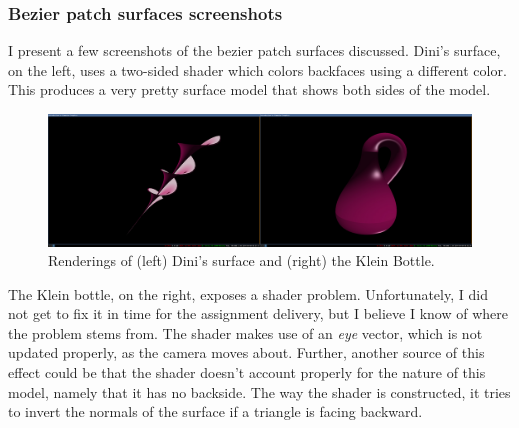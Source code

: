 \documentclass[11pt]{article}
\begin{document}
\subsubsection{Bezier patch surfaces screenshots}
I present a few screenshots of the bezier patch surfaces discussed. Dini's
surface, on the left, uses a two-sided shader which colors backfaces using a
different color. This produces a very pretty surface model that shows both
sides of the model.
\begin{figure}[H]
    \center
    \includegraphics[scale=0.25]{figures/surfaces}
    \caption{Renderings of (left) Dini's surface and (right) the Klein Bottle.}
    \label{fig:surfaces}
\end{figure}
The Klein bottle, on the right, exposes a shader problem. Unfortunately, I did
not get to fix it in time for the assignment delivery, but I believe I know of
where the problem stems from. The shader makes use of an {\it eye} vector,
which is not updated properly, as the camera moves about. Further, another
source of this effect could be that the shader doesn't account properly for
the nature of this model, namely that it has no backside. The way the shader
is constructed, it tries to invert the normals of the surface if a triangle is
facing backward.
\end{document}
